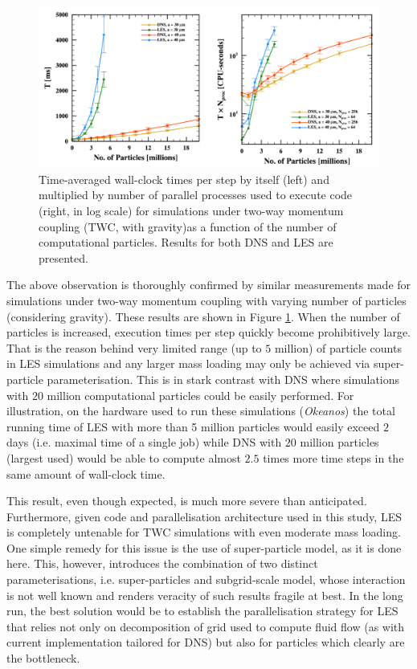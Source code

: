 \documentclass{pracamgren}
\begin{document}
\begin{figure}[ht]
\centering
\includegraphics[width=13.5cm]{figures/3-03_pfstwc.pdf}
\caption{
Time-averaged wall-clock times per step by itself (left) and multiplied by number of parallel processes used to execute code (right, in log scale) for simulations under two-way momentum coupling (TWC, with gravity)as a function of  the number of computational particles. 
Results for both DNS and LES are presented.
}
\label{fig:pfstwc}
\end{figure}

The above observation is thoroughly confirmed by similar measurements made for simulations under two-way momentum coupling with varying number of particles (considering gravity).
These results are shown in Figure \ref{fig:pfstwc}.
When the number of particles is increased, execution times per step quickly become prohibitively large.
That is the reason behind very limited range (up to $5$ million) of particle counts in LES simulations and any larger mass loading may only be achieved via super-particle parameterisation.
This is in stark contrast with DNS where simulations with $20$ million computational particles could be easily performed.
For illustration, on the hardware used to run these simulations (\emph{Okeanos}) the total running time of LES with more than 5 million particles would easily exceed $2$ days (i.e. maximal time of a single job) while DNS with $20$ million particles (largest used) would be able to compute almost $2.5$ times more time steps in the same amount of wall-clock time.

This result, even though expected, is much more severe than anticipated.
Furthermore, given code and parallelisation architecture used in this study, LES is completely untenable for TWC simulations with even moderate mass loading.
One simple remedy for this issue is the use of super-particle model, as it is done here.
This, however, introduces the combination of two distinct parameterisations, i.e. super-particles and subgrid-scale model, whose interaction is not well known and renders veracity of such results fragile at best.
In the long run, the best solution would be to establish the parallelisation strategy for LES that relies not only on decomposition of grid used to compute fluid flow (as with current implementation tailored for DNS) but also for particles which clearly are the bottleneck.
\end{document}

